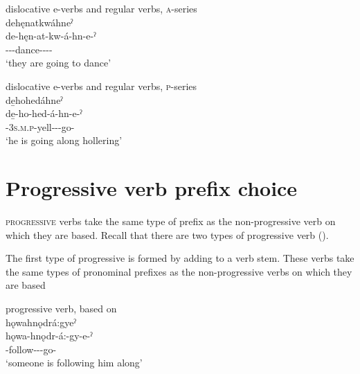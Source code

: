 \ea\label{ex:motionpronchoice31} dislocative e-verbs and regular verbs, \textsc{a}-series\\
dehęnatkwáhneˀ\\
\gll de-hęn-at-kw-á-hn-e-ˀ\\
 {\dualic}--{\semireflexive}-dance-{\joinerA}-{\dislocative}--{\stative}\\
\glt `they are going to dance'
\z


\ea\label{ex:motionpronchoice38} dislocative e-verbs and regular verbs, \textsc{p}-series\\
de̱hohedáhneˀ\\
\gll de̱-ho-hed-á-hn-e-ˀ\\
 {\dualic}-\textsc{3s.m.p}-yell-{\joinerA}-{\dislocative}-go-{\stative}\\
\glt `he is going along hollering'
\z



\section{Progressive verb prefix choice} \label{ch:Progressive verb prefix choice}
\textsc{progressive} verbs take the same type of prefix as the non-progressive verb on which they are based. Recall that there are two types of progressive verb (). 

The first type of progressive is formed by adding  to a verb stem. These verbs take the same types of pronominal prefixes as the non-progressive verbs on which they are based 

\ea\label{ex:motionpronchoice4}  progressive verb, based on \\
hǫwahnǫdrá:gyeˀ\\
\gll hǫwa-hnǫdr-á:-gy-e-ˀ\\
 -follow-{\joinerA}-{\progressive}-go-{\stative} \\
\glt `someone is following him along'
\z

